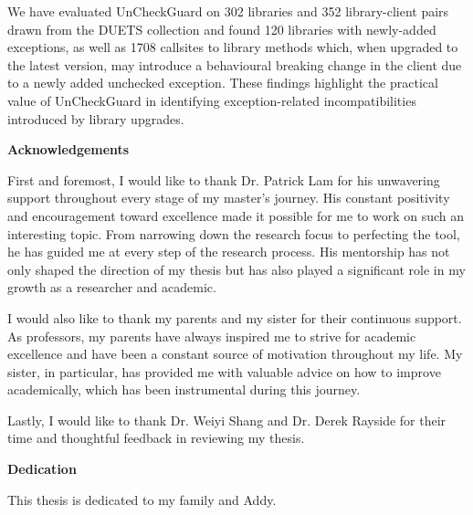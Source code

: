       We have evaluated UnCheckGuard on 302 libraries and 352 library-client pairs drawn from the DUETS collection
      and found 120 libraries with newly-added exceptions, as well as 1708 callsites to library methods which,
      when upgraded to the latest version, may introduce
      a behavioural breaking change in the client due to a newly added unchecked exception. These findings
      highlight the practical value of UnCheckGuard in identifying exception-related incompatibilities
      introduced by library upgrades.

\cleardoublepage
{}    %

\begin{center}\textbf{Acknowledgements}\end{center}

First and foremost, I would like to thank Dr. Patrick Lam for his unwavering support throughout every stage of my master's journey. His constant positivity and encouragement toward excellence made it possible for me to work on such an interesting topic. From narrowing down the research focus to perfecting the tool, he has guided me at every step of the research process. His mentorship has not only shaped the direction of my thesis but has also played a significant role in my growth as a researcher and academic.

I would also like to thank my parents and my sister for their continuous support. As professors, my parents have always inspired me to strive for academic excellence and have been a constant source of motivation throughout my life. My sister, in particular, has provided me with valuable advice on how to improve academically, which has been instrumental during this journey.

Lastly, I would like to thank Dr. Weiyi Shang and Dr. Derek Rayside for their time and thoughtful feedback in reviewing my thesis.
\cleardoublepage
{}    %


\begin{center}\textbf{Dedication}\end{center}
This thesis is dedicated to my family and Addy.
\cleardoublepage
{}    %



